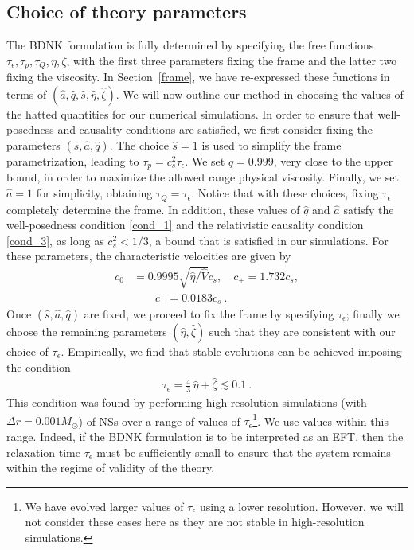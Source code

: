 \documentclass[prd,aps,twocolumn,floats,floatfix,nofootinbib,superscriptaddress] {revtex4-1}
\begin{document}
\subsection{Choice of theory parameters}
The BDNK formulation is fully determined by specifying the free functions $\tau_{\epsilon},\tau_{p},\tau_{Q},\eta,\zeta$, 
with the first three parameters fixing the frame and the latter two fixing the viscosity.  In Section~\ref{frame}, we have re-expressed these functions in terms of $(\hat{a}, \hat{q}, \hat{s},
\hat{\eta}, \hat{\zeta})$.  We will now outline our method in choosing the values of the hatted quantities for our numerical simulations.
In order to ensure that well-posedness and causality conditions are satisfied, we first consider fixing the parameters $(\hat{s} ,\hat{a},\hat{q})$.
The choice $\hat{s}=1$ is used to simplify the frame parametrization, leading to $\tau_p=c_s^2 \tau_{\epsilon}$.  
We set $\hat{q}=0.999$, very close to the upper bound, in order to maximize the allowed range physical viscosity. Finally, we set $\hat{a}=1$ for simplicity, obtaining $\tau_{Q}=\tau_{\epsilon}$. Notice that with these choices, fixing $\tau_{\epsilon}$ completely determine the frame. In addition, these values of $\hat{q}$ and $\hat{a}$ satisfy the well-posedness condition \eqref{cond_1} and the relativistic causality condition \eqref{cond_3}, as long as $c_s^2  < 1/3$, a bound that is satisfied in our simulations. For these parameters, the characteristic velocities are given by
\begin{align*}
c_0 &= 0.9995 \sqrt{\hat{\eta}/\hat{V}} c_s,\quad c_{+}= 1.732c_s,\nonumber\\
& \qquad c_{-} = 0.0183 c_s~. 
\end{align*}
%
Once $(\hat{s},\hat{a},\hat{q})$ are fixed, we proceed to fix the frame by specifying $\tau_\epsilon$; finally  we  choose the remaining parameters $(\hat{\eta}, \hat{\zeta})$ such that they are consistent with our choice of $\tau_\epsilon$.  Empirically, we find that stable evolutions can be achieved imposing the condition 
\begin{align}
\tau_{\epsilon}=\tfrac{4}{3}\,\hat{\eta}+\hat{\zeta} \lesssim 0.1~.  
\end{align}
This condition was found by performing high-resolution simulations (with $\Delta r=0.001 M_\odot$) of NSs over a range of values of $\tau_{\epsilon}$\footnote{We have evolved larger values of $\tau_\epsilon$ using a lower resolution.  However, we will not consider these cases here as they are not stable in high-resolution simulations.}. We use values within this range. 
Indeed, if the BDNK formulation is to be interpreted as an EFT, then the relaxation time $\tau_\epsilon$ must be sufficiently small to ensure that the system remains within the regime of validity of the theory.
\end{document}
